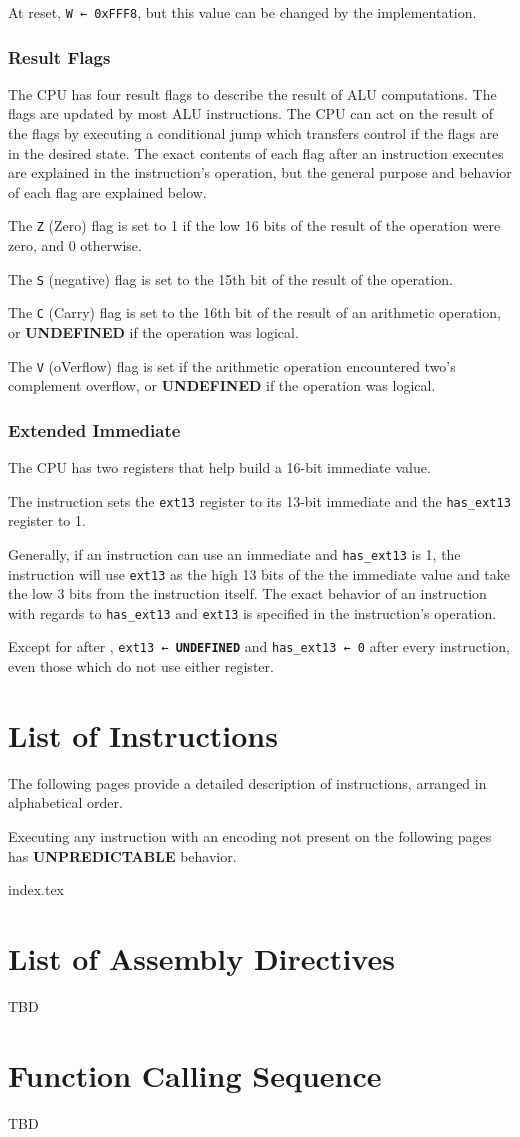 \documentclass[12pt,a4paper]{article}
\newcommand{\undefined}{\textbf{UNDEFINED}}
\newcommand{\unpredictable}{\textbf{UNPREDICTABLE}}
\begin{document}
At reset, \texttt{W ← 0xFFF8}, but this value can be changed by the implementation.

\subsubsection{Result Flags}
The CPU has four result flags to describe the result of ALU computations. The flags are updated by most ALU instructions. The CPU can act on the result of the flags by executing a conditional jump which transfers control if the flags are in the desired state. The exact contents of each flag after an instruction executes are explained in the instruction's operation, but the general purpose and behavior of each flag are explained below.

The \texttt{Z} (Zero) flag is set to 1 if the low 16 bits of the result of the operation were zero, and 0 otherwise.

The \texttt{S} (negative) flag is set to the 15th bit of the result of the operation.

The \texttt{C} (Carry) flag is set to the 16th bit of the result of an arithmetic operation, or \undefined{} if the operation was logical.

The \texttt{V} (oVerflow) flag is set if the arithmetic operation encountered two's complement overflow, or \undefined{} if the operation was logical.

\subsubsection{Extended Immediate}
The CPU has two registers that help build a 16-bit immediate value.

The  instruction sets the \texttt{ext13} register to its 13-bit immediate and the \texttt{has\_ext13} register to 1.

Generally, if an instruction can use an immediate and \texttt{has\_ext13} is 1, the instruction will use \texttt{ext13} as the high 13 bits of the the immediate value and take the low 3 bits from the instruction itself. The exact behavior of an instruction with regards to \texttt{has\_ext13} and \texttt{ext13} is specified in the instruction's operation.

Except for after , \texttt{ext13 ← \undefined{}} and \texttt{has\_ext13 ← 0} after every instruction, even those which do not use either register.

\pagebreak

\section{List of Instructions}
The following pages provide a detailed description of instructions, arranged in alphabetical order.

Executing any instruction with an encoding not present on the following pages has \unpredictable{} behavior.
\pagebreak

{index.tex}

\section{List of Assembly Directives}
TBD
\pagebreak

\section{Function Calling Sequence}
TBD
\pagebreak
\end{document}
